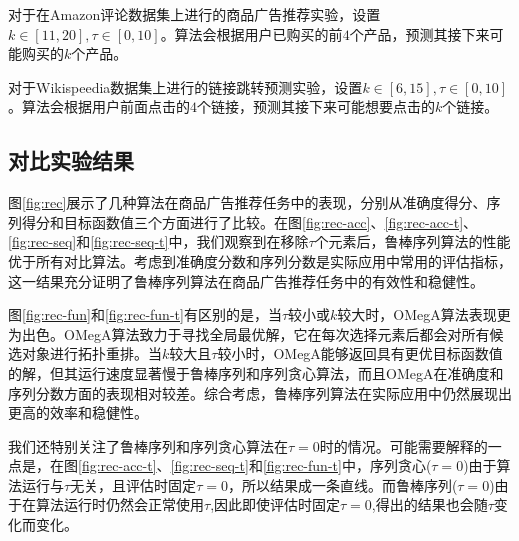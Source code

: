 对于在Amazon评论数据集上进行的商品广告推荐实验，设置$k\in[11,20],\tau \in[0,10]$。算法会根据用户已购买的前$4$个产品，预测其接下来可能购买的$k$个产品。

对于Wikispeedia数据集上进行的链接跳转预测实验，设置$k\in[6,15],\tau \in[0,10]$。算法会根据用户前面点击的$4$个链接，预测其接下来可能想要点击的$k$个链接。


\subsection{对比实验结果}

图\ref{fig:rec}展示了几种算法在商品广告推荐任务中的表现，分别从准确度得分、序列得分和目标函数值三个方面进行了比较。在图\ref{fig:rec-acc}、\ref{fig:rec-acc-t}、\ref{fig:rec-seq}和\ref{fig:rec-seq-t}中，我们观察到在移除$\tau$个元素后，鲁棒序列算法的性能优于所有对比算法。考虑到准确度分数和序列分数是实际应用中常用的评估指标，这一结果充分证明了鲁棒序列算法在商品广告推荐任务中的有效性和稳健性。

图\ref{fig:rec-fun}和\ref{fig:rec-fun-t}有区别的是，当$\tau$较小或$k$较大时，OMegA算法表现更为出色。OMegA算法致力于寻找全局最优解，它在每次选择元素后都会对所有候选对象进行拓扑重排。当$k$较大且$\tau$较小时，OMegA能够返回具有更优目标函数值的解，但其运行速度显著慢于鲁棒序列和序列贪心算法，而且OMegA在准确度和序列分数方面的表现相对较差。综合考虑，鲁棒序列算法在实际应用中仍然展现出更高的效率和稳健性。

我们还特别关注了鲁棒序列和序列贪心算法在$\tau=0$时的情况。可能需要解释的一点是，在图\ref{fig:rec-acc-t}、\ref{fig:rec-seq-t}和\ref{fig:rec-fun-t}中，序列贪心($\tau=0$)由于算法运行与$\tau$无关，且评估时固定$\tau=0$，所以结果成一条直线。而鲁棒序列($\tau=0$)由于在算法运行时仍然会正常使用$\tau$,因此即使评估时固定$\tau=0$,得出的结果也会随$\tau$变化而变化。

